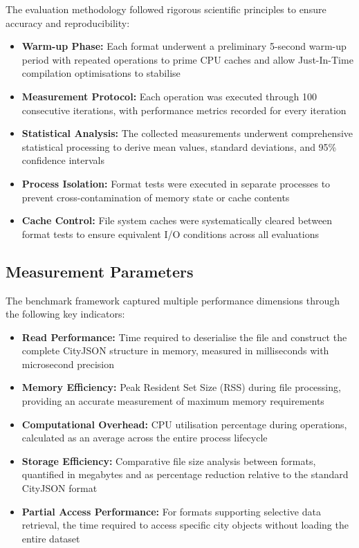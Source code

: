 The evaluation methodology followed rigorous scientific principles to ensure accuracy and reproducibility:

\begin{itemize}
  \item \textbf{Warm-up Phase:} Each format underwent a preliminary 5-second warm-up period with repeated operations to prime CPU caches and allow Just-In-Time compilation optimisations to stabilise

  \item \textbf{Measurement Protocol:} Each operation was executed through 100 consecutive iterations, with performance metrics recorded for every iteration

  \item \textbf{Statistical Analysis:} The collected measurements underwent comprehensive statistical processing to derive mean values, standard deviations, and 95\% confidence intervals

  \item \textbf{Process Isolation:} Format tests were executed in separate processes to prevent cross-contamination of memory state or cache contents

  \item \textbf{Cache Control:} File system caches were systematically cleared between format tests to ensure equivalent I/O conditions across all evaluations
\end{itemize}

\subsection{Measurement Parameters}
\label{result:benchmark_on_local_environment:measurement_parameters}

The benchmark framework captured multiple performance dimensions through the following key indicators:

\begin{itemize}
  \item \textbf{Read Performance:} Time required to deserialise the file and construct the complete CityJSON structure in memory, measured in milliseconds with microsecond precision

  \item \textbf{Memory Efficiency:} Peak Resident Set Size (RSS) during file processing, providing an accurate measurement of maximum memory requirements

  \item \textbf{Computational Overhead:} CPU utilisation percentage during operations, calculated as an average across the entire process lifecycle

  \item \textbf{Storage Efficiency:} Comparative file size analysis between formats, quantified in megabytes and as percentage reduction relative to the standard CityJSON format

  \item \textbf{Partial Access Performance:} For formats supporting selective data retrieval, the time required to access specific city objects without loading the entire dataset
\end{itemize}

